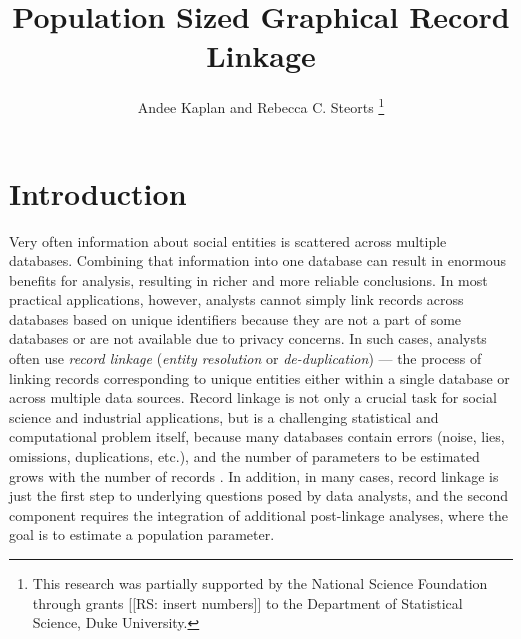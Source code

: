 \documentclass[11pt]{article}\usepackage[]{graphicx}\usepackage[]{color}
\begin{document}
\title{Population Sized Graphical Record Linkage}




\author{Andee Kaplan and Rebecca C. Steorts
\thanks{This research was partially supported by the National Science Foundation through grants [[RS: insert numbers]] to the Department of Statistical Science, Duke University.}
 }


\maketitle

\vspace*{-1em}
\begin{abstract}

\end{abstract}




\section{Introduction}
Very often information about social entities is scattered across multiple databases.  Combining that information into one database can result in enormous benefits for analysis, resulting in richer and more reliable conclusions.
In most practical applications, however, analysts cannot simply link records across databases based on unique identifiers 
because they are not a part of some databases or are not available due to privacy concerns. 
In such cases, analysts often use {\em record linkage} ({\em entity resolution} or {\em de-duplication}) --- the process of linking records corresponding to unique entities either within a single database or across multiple data sources.  Record linkage is not only a crucial task for social science and industrial applications, but is a challenging statistical and computational problem itself, because many databases contain errors (noise, lies, omissions, duplications, etc.), and the number of parameters to be estimated grows with the number of records \citep{winkler_2000, christen_2012, gutman_2013, BilenkoMooney03, Hsuetal00, McCallumWellner04, LumPriceBanks13, Larsen05, Sadinle14, Jewelletal13}. In addition, in many cases, record linkage is just the first step to underlying questions posed by data analysts, and the second component requires the integration of additional post-linkage analyses, where the goal is to estimate a population parameter. 
\end{document}

